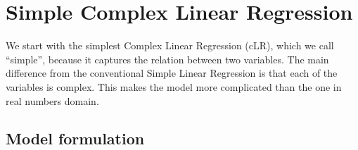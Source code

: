 \documentclass[
]{book}
\begin{document}
\hypertarget{simpleCLR}{%
\chapter{Simple Complex Linear Regression}\label{simpleCLR}}

We start with the simplest Complex Linear Regression (cLR), which we call ``simple'', because it captures the relation between two variables. The main difference from the conventional Simple Linear Regression is that each of the variables is complex. This makes the model more complicated than the one in real numbers domain.

\hypertarget{simpleCLRModel}{%
\section{Model formulation}\label{simpleCLRModel}}
\end{document}
